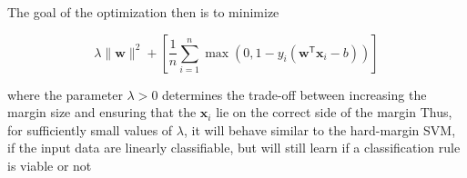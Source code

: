\documentclass[aspectratio=169]{beamer}\usepackage[]{graphicx}\usepackage[]{xcolor}
\begin{document}
\begin{frame}
   
    The goal of the optimization then is to minimize
    
    \[ 
        \lambda \lVert \mathbf{w} \rVert^2 +\left[\frac 1 n \sum_{i=1}^n \max\left(0, 1 - y_i(\mathbf{w}^\mathsf{T} \mathbf{x}_i - b)\right) \right]
    \]
    
    where the parameter $\lambda > 0$ determines the trade-off between increasing the margin size and ensuring that the $\mathbf{x}_i$ lie on the correct side of the margin
    \vfill
    Thus, for sufficiently small values of $\lambda$, it will behave similar to the hard-margin SVM, if the input data are linearly classifiable, but will still learn if a classification rule is viable or not
\end{frame}



\end{document}
